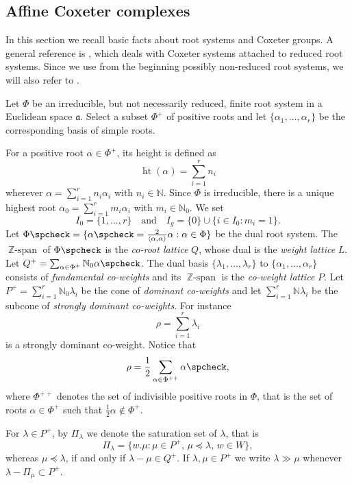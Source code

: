 \documentclass[11pt]{amsart}
\newcommand{\NN}{\mathbb{N}}
\newcommand{\height}{\operatorname{ht}}
\newcommand{\sprod}[2]{\langle {#1}, {#2} \rangle}
\newcommand{\zspan}{\operatorname{\mathbb{Z}-span}}
\theoremstyle{plain}
\theoremstyle{definition}
\numberwithin{equation}{section}
\begin{document}
\subsection{Affine Coxeter complexes}
\label{sec:1.2}
In this section we recall basic facts about root systems and Coxeter groups. A general reference is \cite{Bourbaki2002},
which deals with Coxeter systems attached to reduced root systems. Since we use from the beginning possibly non-reduced
root systems, we will also refer to \cite{mz1, park}.

Let $\Phi$ be an irreducible, but not necessarily reduced, finite root system in a Euclidean space $\mathfrak{a}$. 
Select a subset $\Phi^+$ of positive roots and let $\{\alpha_1,\dots,\alpha_r\}$ be the corresponding basis of simple roots.

For a positive root $\alpha \in \Phi^+$, its height is defined as
\[
	\height(\alpha)=\sum_{i=1}^rn_i 
\]
wherever $\alpha=\sum_{i=1}^rn_i\alpha_i$ with $n_i\in\NN$. Since $\Phi$ is irreducible, there is a unique highest root
$\alpha_0=\sum_{i=1}^rm_i\alpha_i$ with $m_i\in\NN_0$. We set
\[
	I_0=\{1,\dots,r\}
	\quad\text{and}\quad
	I_g=\{0\}\cup\{i\in I_0:m_i=1\}.
\]
Let $\Phi\spcheck=\{\alpha\spcheck =\frac2{\sprod{\alpha}{\alpha}}\alpha:\alpha\in\Phi\}$ be the dual root system.
The $\zspan$ of $\Phi\spcheck$ is the \emph{co-root lattice} $Q$, whose dual is the \emph{weight lattice} $L$.
Let $Q^+=\sum_{\alpha\in\Phi^+}\NN_0\alpha\spcheck$. The dual basis $\{\lambda_1,\dots,\lambda_r\}$ to 
$\{\alpha_1,\dots,\alpha_r\}$ consists of \emph{fundamental co-weights} and its $\zspan$ is the \emph{co-weight lattice} $P$.
Let $P^+=\sum_{i=1}^r\NN_0\lambda_i$ be the cone of \emph{dominant co-weights} and let $\sum_{i=1}^r\NN \lambda_i$ be 
the subcone of \emph{strongly dominant co-weights}. For instance
\[
	\rho=\sum_{i=1}^r\lambda_i
\]
is a strongly dominant co-weight. Notice that
\[
	\rho=\frac12\sum_{\alpha \in \Phi^{++}} \alpha\spcheck,
\]
where $\Phi^{++}$ denotes the set of indivisible positive roots in $\Phi$, that is the set of roots $\alpha \in \Phi^+$
such that $\frac{1}{2} \alpha \notin \Phi^+$.

For $\lambda \in P^+$, by $\Pi_{\lambda}$ we denote the saturation set of $\lambda$, that is
\[
	\Pi_\lambda= \{w.\mu:\mu\in P^+,\, \mu\preceq\lambda,\, w\in W\},
\]
whereas $\mu \preceq \lambda$, if and only if $\lambda - \mu\in Q^+$. If $\lambda, \mu \in P^+$ we write $\lambda \gg \mu$
whenever $\lambda - \Pi_\mu \subset P^+$. 
\end{document}
